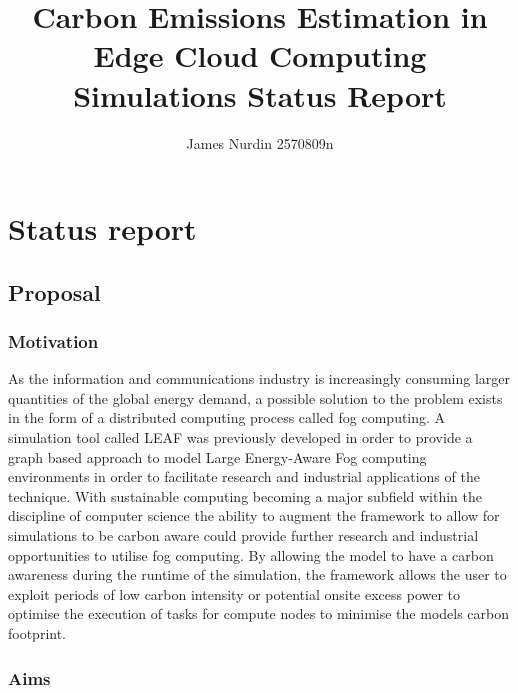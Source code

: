 \documentclass[11pt]{article}
\title{Carbon Emissions Estimation in Edge Cloud Computing Simulations Status Report}
\author{James Nurdin 2570809n}
\begin{document}
    \maketitle


\section{Status report}

\subsection{Proposal}\label{proposal}

\subsubsection{Motivation}\label{motivation}

As the information and communications industry is increasingly consuming larger quantities of the global energy demand,
a possible solution to the problem exists in the form of a distributed computing process called fog computing.
A simulation tool called LEAF was previously developed in order to provide a graph based approach to model Large Energy-Aware Fog
computing environments in order to facilitate research and industrial applications of the technique.
With sustainable computing becoming a major subfield within the discipline of computer science the ability to augment the
framework to allow for simulations to be carbon aware could provide further research and industrial opportunities to utilise fog computing.
By allowing the model to have a carbon awareness during the runtime of the simulation, the framework allows the user to
exploit periods of low carbon intensity or potential onsite excess power to optimise the execution of tasks for
compute nodes to minimise the models carbon footprint.

\subsubsection{Aims}\label{aims}
\end{document}
